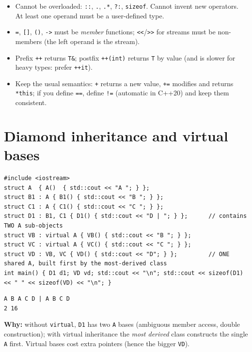 \documentclass[10pt,a4paper,openany,oneside]{report}
\newcommand{\prio}[1]{\texorpdfstring{\ifcase#1\or{\color{gold}\ding{72}}\or{\color{gold}\ding{72}\ding{72}}\or{\color{gold}\ding{72}\ding{72}\ding{72}}\fi}{}}
\begin{document}
\begin{mustbox}
\begin{itemize}[nosep]
\item Cannot be overloaded: \texttt{::}, \texttt{.}, \texttt{.*}, \texttt{?:}, \texttt{sizeof}. Cannot invent new operators. At least one operand must be a user-defined type.
\item \texttt{=}, \texttt{[]}, \texttt{()}, \texttt{->} must be \emph{member} functions; \texttt{<<}/\texttt{>>} for streams must be non-members (the left operand is the stream).
\item Prefix \texttt{++} returns \texttt{T\&}; postfix \texttt{++(int)} returns \texttt{T} by value (and is slower for heavy types: prefer \texttt{++it}).
\item Keep the usual semantics: \texttt{+} returns a new value, \texttt{+=} modifies and returns \texttt{*this}; if you define \texttt{==}, define \texttt{!=} (automatic in C++20) and keep them consistent.
\end{itemize}
\end{mustbox}

\section{Diamond inheritance and virtual bases \prio{2}}
\begin{lstlisting}[language={[11]C++},title={Two copies of A vs. one shared A}]
#include <iostream>
struct A  { A()  { std::cout << "A "; } };
struct B1 : A { B1() { std::cout << "B "; } };
struct C1 : A { C1() { std::cout << "C "; } };
struct D1 : B1, C1 { D1() { std::cout << "D | "; } };      // contains TWO A sub-objects
struct VB : virtual A { VB() { std::cout << "B "; } };
struct VC : virtual A { VC() { std::cout << "C "; } };
struct VD : VB, VC { VD() { std::cout << "D"; } };         // ONE shared A, built first by the most-derived class
int main() { D1 d1; VD vd; std::cout << "\n"; std::cout << sizeof(D1) << " " << sizeof(VD) << "\n"; }
\end{lstlisting}
\begin{lstlisting}[style=out,title={Answer: captured output}]
A B A C D | A B C D
2 16
\end{lstlisting}
\textbf{Why:} without \texttt{virtual}, \texttt{D1} has two \texttt{A} bases (ambiguous member access, double construction); with virtual inheritance the \emph{most derived} class constructs the single \texttt{A} first. Virtual bases cost extra pointers (hence the bigger \texttt{VD}).
\end{document}
